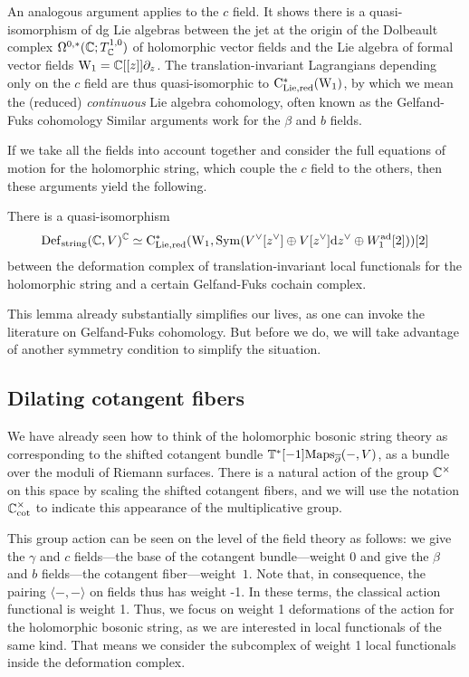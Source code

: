 An analogous argument applies to the $c$ field. 
It shows there is a quasi-isomorphism of dg Lie algebras 
between the jet at the origin of the Dolbeault complex $\Omega^{0,*}(\mathbb C ; T^{1,0}_\mathbb C)$ of holomorphic vector fields 
and the Lie algebra of formal vector fields ${\rm W}_1 = \mathbb C[[z]]\partial_z$.
The translation-invariant Lagrangians depending only on the $c$ field 
are thus quasi-isomorphic to ${\rm C}_{\rm Lie,red}^*({\rm W}_1)$,
by which we mean the (reduced) {\em continuous} Lie algebra cohomology,
often known as the Gelfand-Fuks cohomology 
Similar arguments work for the $\beta$ and $b$ fields.

If we take all the fields into account together and consider the full equations of motion 
for the holomorphic string,
which couple the $c$ field to the others,
then these arguments yield the following.

\begin{lem}\label{lem: gf}
There is a quasi-isomorphism 
\[
{\rm Def}_{\rm string}(\mathbb C,V)^\mathbb C \simeq {\rm C}_{\rm Lie,red}^*({\rm W}_1, {\rm Sym}(V^\vee[z^\vee] \oplus V[z^\vee] {\rm d} z^\vee \oplus W_1^{\rm ad}[2])) [2]
\]
between the deformation complex of translation-invariant local functionals for the holomorphic string and a certain Gelfand-Fuks cochain complex.
\end{lem}

This lemma already substantially simplifies our lives, 
as one can invoke the literature on Gelfand-Fuks cohomology.
But before we do,
we will take advantage of another symmetry condition to simplify the situation.

\subsection{Dilating cotangent fibers}

We have already seen how to think of the holomorphic bosonic string theory 
as corresponding to the shifted cotangent bundle $\mathbb T^*[-1]{\rm Maps}_{\overline{\partial}}(-, V)$, 
as a bundle over the moduli of Riemann surfaces. 
There is a natural action of the group $ \mathbb C^\times$ on this space
by scaling the shifted cotangent fibers,
and we will use the notation $\mathbb C^\times_{\rm cot}$ to indicate this appearance of the multiplicative group.

This group action can be seen on the level of the field theory as follows: 
we give the $\gamma$ and $c$ fields---the base of the cotangent bundle---weight $0$ and give the $\beta$ and $b$ fields---the cotangent fiber---weight~$1$. 
Note that, in consequence, the pairing $\langle-,-\rangle$ on fields thus has weight -1.
In these terms, the classical action functional is weight 1. 
Thus, we focus on weight 1 deformations of the action for the holomorphic bosonic string,
as we are interested in local functionals of the same kind.
That means we consider the subcomplex of weight 1 local functionals inside the deformation complex.

